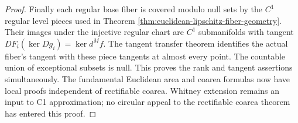\begin{proof}
Finally each regular base fiber is covered modulo null sets by the $C^1$ regular level pieces used in Theorem \ref{thm:euclidean-lipschitz-fiber-geometry}. Their images under the injective regular chart are $C^1$ submanifolds with tangent $DF_i(\ker Dg_i)=\ker d^Mf$. The tangent transfer theorem identifies the actual fiber's tangent with these piece tangents at almost every point. The countable union of exceptional subsets is null. This proves the rank and tangent assertions simultaneously. The fundamental Euclidean area and coarea formulas now have local proofs independent of rectifiable coarea. Whitney extension remains an input to C1 approximation; no circular appeal to the rectifiable coarea theorem has entered this proof.
\end{proof}

